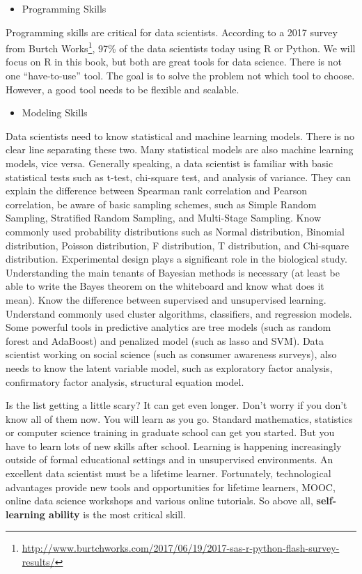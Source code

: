 \documentclass[12pt,]{krantz}
\providecommand{\tightlist}{%
  \setlength{\itemsep}{0pt}\setlength{\parskip}{0pt}}
\renewcommand{\href}[2]{#2\footnote{\url{#1}}}
\theoremstyle{definition}
\theoremstyle{definition}
\theoremstyle{remark}
\begin{document}
\begin{itemize}
\tightlist
\item
  Programming Skills
\end{itemize}

Programming skills are critical for data scientists. According to a 2017
survey from
\href{http://www.burtchworks.com/2017/06/19/2017-sas-r-python-flash-survey-results/}{Burtch
Works}, 97\% of the data scientists today using R or Python. We will
focus on R in this book, but both are great tools for data science.
There is not one ``have-to-use'' tool. The goal is to solve the problem
not which tool to choose. However, a good tool needs to be flexible and
scalable.

\begin{itemize}
\tightlist
\item
  Modeling Skills
\end{itemize}

Data scientists need to know statistical and machine learning models.
There is no clear line separating these two. Many statistical models are
also machine learning models, vice versa. Generally speaking, a data
scientist is familiar with basic statistical tests such as t-test,
chi-square test, and analysis of variance. They can explain the
difference between Spearman rank correlation and Pearson correlation, be
aware of basic sampling schemes, such as Simple Random Sampling,
Stratified Random Sampling, and Multi-Stage Sampling. Know commonly used
probability distributions such as Normal distribution, Binomial
distribution, Poisson distribution, F distribution, T distribution, and
Chi-square distribution. Experimental design plays a significant role in
the biological study. Understanding the main tenants of Bayesian methods
is necessary (at least be able to write the Bayes theorem on the
whiteboard and know what does it mean). Know the difference between
supervised and unsupervised learning. Understand commonly used cluster
algorithms, classifiers, and regression models. Some powerful tools in
predictive analytics are tree models (such as random forest and
AdaBoost) and penalized model (such as lasso and SVM). Data scientist
working on social science (such as consumer awareness surveys), also
needs to know the latent variable model, such as exploratory factor
analysis, confirmatory factor analysis, structural equation model.

Is the list getting a little scary? It can get even longer. Don't worry
if you don't know all of them now. You will learn as you go. Standard
mathematics, statistics or computer science training in graduate school
can get you started. But you have to learn lots of new skills after
school. Learning is happening increasingly outside of formal educational
settings and in unsupervised environments. An excellent data scientist
must be a lifetime learner. Fortunately, technological advantages
provide new tools and opportunities for lifetime learners, MOOC, online
data science workshops and various online tutorials. So above all,
\textbf{self-learning ability} is the most critical skill.
\end{document}
